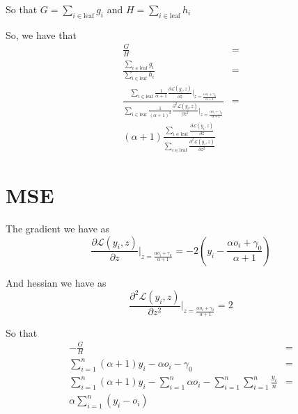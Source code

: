 \documentclass{article}
\begin{document}
So that $G = \sum_{i \in \text{leaf}} g_i$ and $H = \sum_{i \in \text{leaf}} h_i$ 

So, we have that \begin{align*}
    \frac{G}{H} &= \\
    \frac{\sum_{i \in \text{leaf}} g_i}{\sum_{i \in \text{leaf}} h_i} &= \\
    \frac{\sum_{i \in \text{leaf}} \frac{1}{\alpha + 1} \frac{\partial \mathcal{L}(y_i, z)}{\partial z}\big|_{z = \frac{\alpha o_i + \gamma_0}{\alpha + 1}}}{\sum_{i \in \text{leaf}} \frac{1}{(\alpha + 1)^2} \frac{\partial^2 \mathcal{L}(y_i, z)}{\partial z^2}\big|_{z = \frac{\alpha o_i + \gamma_0}{\alpha + 1}}} &= \\
    (\alpha + 1)\frac{\sum_{i \in \text{leaf}} \frac{\partial \mathcal{L}(y_i, z)}{\partial z}}{\sum_{i \in \text{leaf}} \frac{\partial^2 \mathcal{L}(y_i, z)}{\partial z^2}}
\end{align*}


\section*{MSE}
The gradient we have as \[
    \frac{\partial \mathcal{L}(y_i, z)}{\partial z}\big|_{z = \frac{\alpha o_i + \gamma_0}{\alpha + 1}} = -2 \left( y_i - \frac{\alpha o_i + \gamma_0}{\alpha + 1} \right)
\]

And hessian we have as \[
    \frac{\partial^2 \mathcal{L}(y_i, z)}{\partial z^2}\big|_{z = \frac{\alpha o_i + \gamma_0}{\alpha + 1}} = 2
\]

So that \begin{align*}
    -\frac{G}{H} &= \\
    \sum_{i=1}^n (\alpha + 1)y_i - \alpha o_i - \gamma_0 &= \\
    \sum_{i=1}^n (\alpha + 1)y_i - \sum_{i=1}^n \alpha o_i - \sum_{i=1}^n \sum_{i=1}^n \frac{y_i}{n} &= \\
    \alpha \sum_{i=1}^n (y_i - o_i)
\end{align*}
\end{document}
